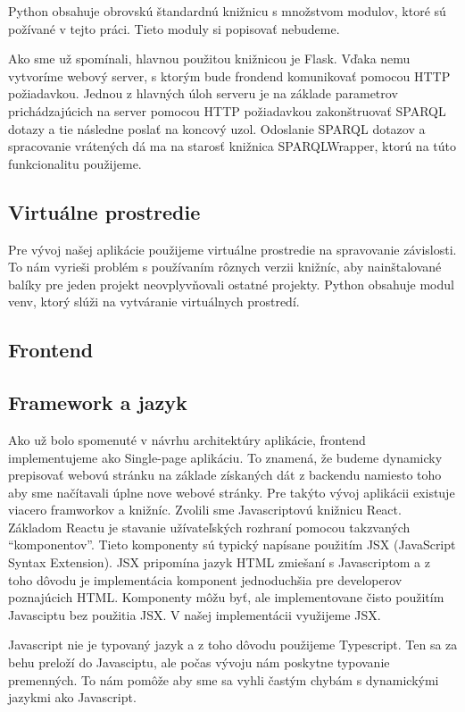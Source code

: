 Python obsahuje obrovskú štandardnú knižnicu s množstvom modulov, ktoré sú požívané v tejto práci. Tieto moduly si popisovať nebudeme. 

Ako sme už spomínali, hlavnou použitou knižnicou je Flask. Vďaka nemu vytvoríme webový server, s ktorým bude frondend komunikovať pomocou HTTP požiadavkou. 
Jednou z hlavných úloh serveru je na základe parametrov prichádzajúcich na server pomocou HTTP požiadavkou zakonštruovať SPARQL dotazy a tie následne poslať na koncový uzol. Odoslanie SPARQL dotazov a spracovanie vrátených dá 
ma na starosť knižnica SPARQLWrapper, ktorú na túto funkcionalitu použijeme. 

\subsection*{Virtuálne prostredie }

Pre vývoj našej aplikácie použijeme virtuálne prostredie na spravovanie závislosti. To nám vyrieši problém s používaním rôznych verzii knižníc, aby nainštalované balíky pre jeden projekt 
neovplyvňovali ostatné projekty. Python obsahuje modul venv, ktorý slúži na vytváranie virtuálnych prostredí. 

\subsection{Frontend}

\subsection*{Framework a jazyk }
Ako už bolo spomenuté v návrhu architektúry aplikácie, frontend implementujeme ako Single-page aplikáciu. To znamená, že budeme dynamicky prepisovať webovú stránku na základe získaných dát 
z backendu namiesto toho aby sme načítavali úplne nove webové stránky. Pre takýto vývoj aplikácii existuje viacero framworkov a knižníc. 
Zvolili sme Javascriptovú knižnicu React. 
Základom Reactu je stavanie užívateľských rozhraní pomocou takzvaných “komponentov”. Tieto komponenty sú typický napísane použitím JSX (JavaScript Syntax Extension). JSX pripomína jazyk HTML zmiešaní s Javascriptom a z toho 
dôvodu je implementácia komponent jednoduchšia pre developerov poznajúcich HTML. Komponenty môžu byť, ale implementovane čisto použitím Javasciptu bez použitia JSX. V našej implementácii využijeme JSX. 

Javascript nie je typovaný jazyk a z toho dôvodu použijeme Typescript. Ten sa za behu preloží do Javasciptu, ale počas vývoju nám poskytne typovanie premenných. To nám pomôže aby sme sa 
vyhli častým chybám s dynamickými jazykmi ako Javascript. 

